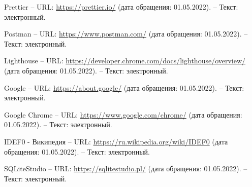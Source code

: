 \begin{thebibliography}{00}
        Prettier
        --
        URL:
        \href{https://prettier.io/}{https://prettier.io/}
        (дата обращения: 01.05.2022).
        --
        Текст: электронный.

        Postman
        --
        URL:
        \href{https://www.postman.com/}{https://www.postman.com/}
        (дата обращения: 01.05.2022).
        --
        Текст: электронный.

        Lighthouse
        --
        URL:
        \href{https://developer.chrome.com/docs/lighthouse/overview/}{https://developer.chrome.com/docs/lighthouse/overview/}
        (дата обращения: 01.05.2022).
        --
        Текст: электронный.

        Google
        --
        URL:
        \href{https://about.google/}{https://about.google/}
        (дата обращения: 01.05.2022).
        --
        Текст: электронный.

        Google Chrome
        --
        URL:
        \href{https://www.google.com/chrome/}{https://www.google.com/chrome/}
        (дата обращения: 01.05.2022).
        --
        Текст: электронный.

        IDEF0 - Википедия
        --
        URL:
        \href{https://ru.wikipedia.org/wiki/IDEF0}{https://ru.wikipedia.org/wiki/IDEF0}
        (дата обращения: 01.05.2022).
        --
        Текст: электронный.

        SQLiteStudio
        --
        URL:
        \href{https://sqlitestudio.pl/}{https://sqlitestudio.pl/}
        (дата обращения: 01.05.2022).
        --
        Текст: электронный.

\begin{comment}

    \bibitem{livejournal}
        Главное - ЖЖ
        [Электронный ресурс] //
        LiveJournal — сервис для ведения блога и развития сообщества
        --
        Режим доступа:
        \href{https://www.livejournal.com/}{https://www.livejournal.com/}
        
    \bibitem{kickstarter}
        Kickstarter
        [Электронный ресурс] //
        Kickstarter - краудфандинговая платформа.
        --
        Режим доступа:
        \href{https://www.kickstarter.com/}{https://www.kickstarter.com/}


\end{comment}
\end{thebibliography}
